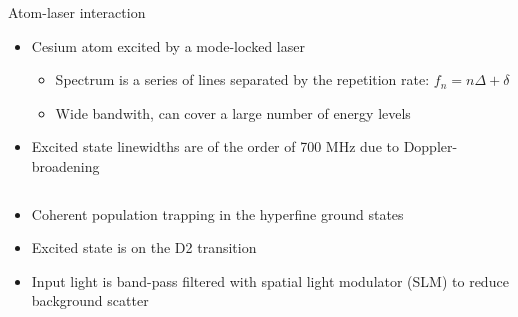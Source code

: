 \begin{block}{Atom-laser interaction}
  \begin{itemize}
  \item Cesium atom excited by a mode-locked laser
    \begin{itemize}
    \item Spectrum is a series of lines separated by the repetition rate: $f_n = n \Delta + \delta$
    \item Wide bandwith, can cover a large number of energy levels
    \end{itemize}
  \item Excited state linewidths are of the order of 700 MHz due to Doppler-broadening
  \end{itemize}
  \begin{columns}
    \begin{column}{0.49\textwidth}
      \begin{figure}
        \begin{center}
          \setlength\fboxsep{0pt}
          \setlength\fboxrule{0.5pt}
        \end{center}
      \end{figure}
      \begin{itemize}
      \item Coherent population trapping in the hyperfine ground states
      \item Excited state is on the D2 transition
      \item Input light is band-pass filtered with spatial light modulator (SLM) to reduce background scatter

\end{itemize}
\end{column}
\end{columns}
\end{block}
